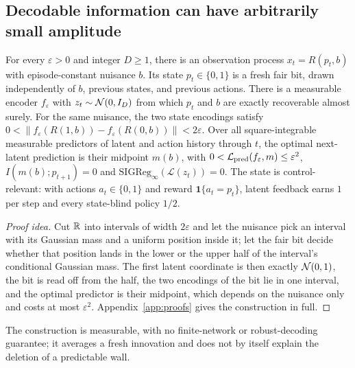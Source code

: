 \subsection{Decodable information can have arbitrarily small amplitude}
\label{sec:amplitude}

\begin{proposition}
\label{prop:amplitude}
For every $\varepsilon>0$ and integer $D\ge1$, there is an observation process $x_t=R(p_t,b)$ with episode-constant nuisance $b$.
Its state $p_t\in\{0,1\}$ is a fresh fair bit, drawn independently of $b$, previous states, and previous actions.
There is a measurable encoder $f_\varepsilon$ with $z_t\sim\mathcal{N}(0,I_D)$ from which $p_t$ and $b$ are exactly recoverable almost surely.
For the same nuisance, the two state encodings satisfy
$0<\|f_\varepsilon(R(1,b))-f_\varepsilon(R(0,b))\|<2\varepsilon$.
Over all square-integrable measurable predictors of latent and action history through $t$, the optimal
next-latent prediction is their midpoint $m(b)$, with $0<\mathcal{L}_{\mathrm{pred}}(f_\varepsilon,m)\le\varepsilon^2$,
$I(m(b);p_{t+1})=0$ and $\mathrm{SIGReg}_\infty(\mathcal L(z_t))=0$.
The state is control-relevant: with actions $a_t\in\{0,1\}$ and reward $\mathbf1\{a_t=p_t\}$, latent
feedback earns $1$ per step and every state-blind policy $1/2$.
\end{proposition}
\begin{proof}[Proof idea]
Cut $\mathbb{R}$ into intervals of width $2\varepsilon$ and let the nuisance pick an interval with its Gaussian
mass and a uniform position inside it; let the fair bit decide whether that position lands in the lower
or the upper half of the interval's conditional Gaussian mass. The first latent coordinate is
then exactly $\mathcal{N}(0,1)$, the bit is read off from the half, the two encodings of the bit lie in one
interval, and the optimal predictor is their midpoint, which depends on the nuisance only and costs at
most $\varepsilon^2$. Appendix~\ref{app:proofs} gives the construction in full.
\end{proof}

The construction is measurable, with no finite-network or robust-decoding guarantee; it averages a
fresh innovation and does not by itself explain the deletion of a predictable wall.
